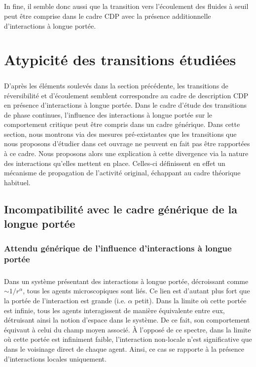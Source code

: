 \subparagraph{}In fine, il semble donc aussi que la transition vers l'écoulement des fluides à seuil peut être comprise dans le cadre CDP avec la présence additionnelle d'interactions à longue portée.

\section{Atypicité des transitions étudiées}


\subparagraph{}D'après les éléments soulevés dans la section précédente, les transitions de réversibilité et d'écoulement semblent correspondre au cadre de description CDP en présence d'interactions à longue portée. Dans le cadre d'étude des transitions de phase continues, l'influence des interactions à longue portée sur le comportement critique peut être compris dans un cadre générique. Dans cette section, nous montrons via des mesures pré-existantes que les transitions que nous proposons d'étudier dans cet ouvrage ne peuvent en fait pas être rapportées à ce cadre. Nous proposons alors une explication à cette divergence via la nature des interactions qu'elles mettent en place. Celles-ci définissent en effet un mécanisme de propagation de l'activité original, échappant au cadre théorique habituel.

\subsection{Incompatibilité avec le cadre générique de la longue portée}

\subsubsection{Attendu générique de l'influence d'interactions à longue portée}

\subparagraph{}Dans un système présentant des interactions à longue portée, décroissant comme ${\sim 1/r^\alpha}$, tous les agents microscopiques sont liés. Ce lien est d'autant plus fort que la portée de l'interaction est grande (i.e. $\alpha$ petit). Dans la limite où cette portée est infinie, tous les agents interagissent de manière équivalente entre eux, détruisant ainsi la notion d'espace dans le système. De ce fait, son comportement équivaut à celui du champ moyen associé. \`A l'opposé de ce spectre, dans la limite où cette portée est infiniment faible, l'interaction non-locale n'est significative que dans le voisinage direct de chaque agent. Ainsi, ce cas se rapporte à la présence d'interactions locales uniquement.

